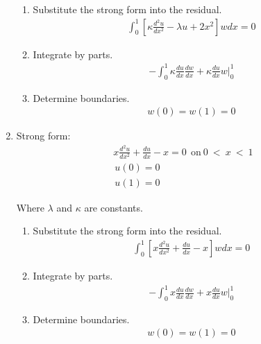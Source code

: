 \documentclass{article}[12pt]%
\begin{document}
\begin{enumerate}
    \begin{enumerate}
        \item Substitute the strong form into the residual. 
        \begin{align*}
            \int^1_0\left[\kappa \frac{d^2 u}{dx^2} - \lambda u + 2x^2\right]wdx = 0  
        \end{align*}
        \item Integrate by parts. 
        \begin{align*}
            -\int^1_0\kappa\frac{du}{dx}\frac{dw}{dx} + \kappa\frac{du}{dx}w\Big|^1_0
        \end{align*}
        \item Determine boundaries.
        \begin{align*}
            w(0) = w(1) = 0
        \end{align*}
    \end{enumerate}


    \item Strong form:
    \begin{align*}
         x \frac{d^2 u}{dx^2} + \frac{du}{dx}  - x = 0~~\mathrm{on}~\mathrm{0} ~<~ x ~ < ~ \mathrm{1}\\
        \frac{}{}u(0) = 0\\
        \frac{}{}u(1) = 0
    \end{align*}

    Where $\lambda$ and $\kappa$ are constants.

    \begin{enumerate}
        \item Substitute the strong form into the residual. 
        \begin{align*}
            \int^1_0\left[x \frac{d^2 u}{dx^2} + \frac{du}{dx}  - x\right]wdx = 0
        \end{align*}
        \item Integrate by parts. 
        \begin{align*}
            -\int^1_0x\frac{du}{dx}\frac{dw}{dx} + x\frac{du}{dx}w\Big|^1_0
        \end{align*}
        \item Determine boundaries.
        \begin{align*}
            w(0) = w(1) = 0
        \end{align*}
    \end{enumerate}
\end{enumerate}
\end{document}
